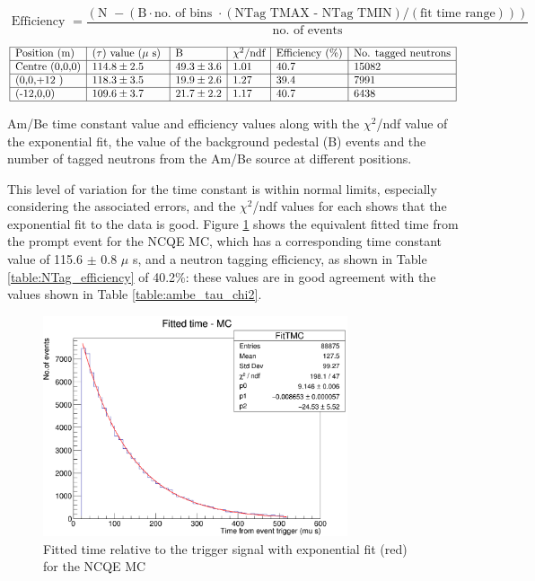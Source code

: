 \begin{equation}
    \text { Efficiency }=\frac{(\text {N } - (\text{B} \cdot \text {no. of bins }  \cdot (\text{NTag TMAX - NTag TMIN}) / (\text{fit time range})))  }{\text { no. of events }}
    \label{eq:efficiency_ambe_calculation}
\end{equation}

\begin{table}
    $$
    \begin{array}{|l|l|l|l|l|l|l|}
    \hline \text{Position (m)} & \text {($\tau$) value ($\mu$ s) } & \text{B} & \text{$\chi^{2}$/ndf} & \text{Efficiency (\%)} & \text{No. tagged neutrons} \\
    \hline \text{Centre (0,0,0)} & 114.8 \pm 2.5 & 49.3 \pm 3.6 & 1.01 & 40.7 & 15082 \\
    \hline \text{(0,0,+12 )} & 118.3 \pm 3.5 & 19.9 \pm 2.6 & 1.27 & 39.4 & 7991\\
    \hline \text{(-12,0,0)} & 109.6 \pm 3.7 & 21.7 \pm 2.2 & 1.17 & 40.7 & 6438 \\
    \hline
    \end{array}
    $$
    \caption{Am/Be time constant value and efficiency values along with the $\chi^{2}$/ndf value of the exponential fit, the value of the background pedestal (B) events and the number of tagged neutrons from the Am/Be source at different positions.}
    \label{table:ambe_tau_chi2}
\end{table}

This level of variation for the time constant is within normal limits, especially considering the associated errors, and the $\chi^{2}$/ndf values for each shows that the exponential fit to the data is good. Figure \ref{fig:MC_time_constant} shows the equivalent fitted time from the prompt event for the NCQE MC, which has a corresponding time constant value of 115.6 $\pm$ 0.8 $\mu$ s, and a neutron tagging efficiency, as shown in Table \ref{table:NTag_efficiency} of 40.2\%: these values are in good agreement with the values shown in Table \ref{table:ambe_tau_chi2}. 

\begin{figure}
    \centering
    \includegraphics[width=0.8\textwidth]{Figures/MC_fitT.png}
    \caption{Fitted time relative to the trigger signal with exponential fit (red) for the NCQE MC}
    \label{fig:MC_time_constant}
\end{figure}

